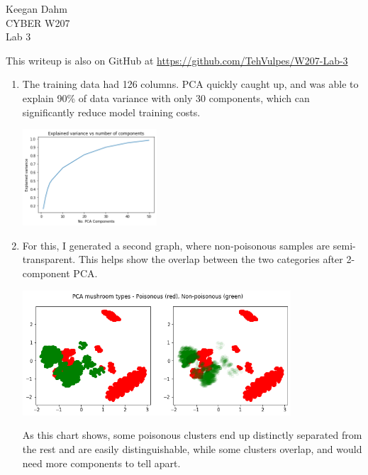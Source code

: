 \documentclass{article}
\begin{document}

\begin{flushright}
Keegan Dahm \\
CYBER W207 \\
Lab 3
\end{flushright}

This writeup is also on GitHub at \href{https://github.com/TehVulpes/W207-Lab-3}{https://github.com/TehVulpes/W207-Lab-3}

\begin{enumerate}[start=1]
\item %
    The training data had 126 columns. PCA quickly caught up, and was able to explain 90\% of data variance with only 30 components, which can significantly reduce model training costs.
    
    \begin{center}
    \includegraphics[width=5cm]{part1.0.png}
    \end{center}

\item %
    For this, I generated a second graph, where non-poisonous samples are semi-transparent. This helps show the overlap between the two categories after 2-component PCA.
    
    \begin{center}
    \includegraphics[width=10cm]{part2.0.png}
    \end{center}
    
    As this chart shows, some poisonous clusters end up distinctly separated from the rest and are easily distinguishable, while some clusters overlap, and would need more components to tell apart.
    

\end{enumerate}
\end{document}
